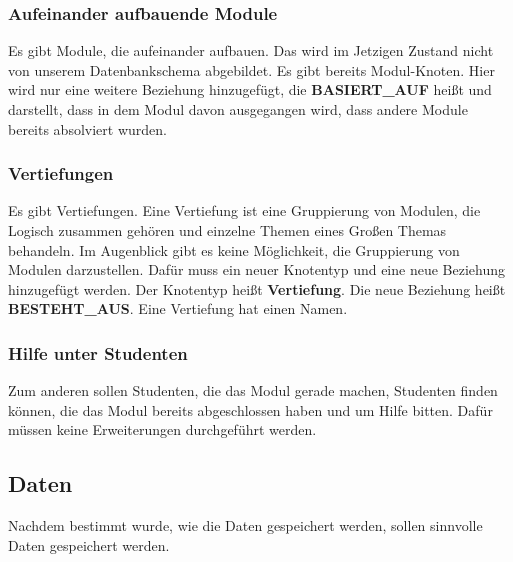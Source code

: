 \vspace{12pt}

\subsubsection{Aufeinander aufbauende Module}
Es gibt Module, die aufeinander aufbauen. Das wird im Jetzigen Zustand nicht von unserem Datenbankschema abgebildet. Es gibt bereits Modul-Knoten. Hier wird nur eine weitere Beziehung hinzugefügt, die \textbf{BASIERT\_AUF} heißt und darstellt, dass in dem Modul davon ausgegangen wird, dass andere Module bereits absolviert wurden.

\vspace{12pt}

\subsubsection{Vertiefungen}
Es gibt Vertiefungen. Eine Vertiefung ist eine Gruppierung von Modulen, die Logisch zusammen gehören und einzelne Themen eines Großen Themas behandeln. Im Augenblick gibt es keine Möglichkeit, die Gruppierung von Modulen darzustellen. Dafür muss ein neuer Knotentyp und eine neue Beziehung hinzugefügt werden. Der Knotentyp heißt \textbf{Vertiefung}. Die neue Beziehung heißt \textbf{BESTEHT\_AUS}. Eine Vertiefung hat einen Namen.

\vspace{12pt}

\subsubsection{Hilfe unter Studenten}
Zum anderen sollen Studenten, die das Modul gerade machen, Studenten finden können, die das Modul bereits abgeschlossen haben und um Hilfe bitten. Dafür müssen keine Erweiterungen durchgeführt werden.

\vspace{18pt}

\subsection{Daten}
Nachdem bestimmt wurde, wie die Daten gespeichert werden, sollen sinnvolle Daten gespeichert werden. 
